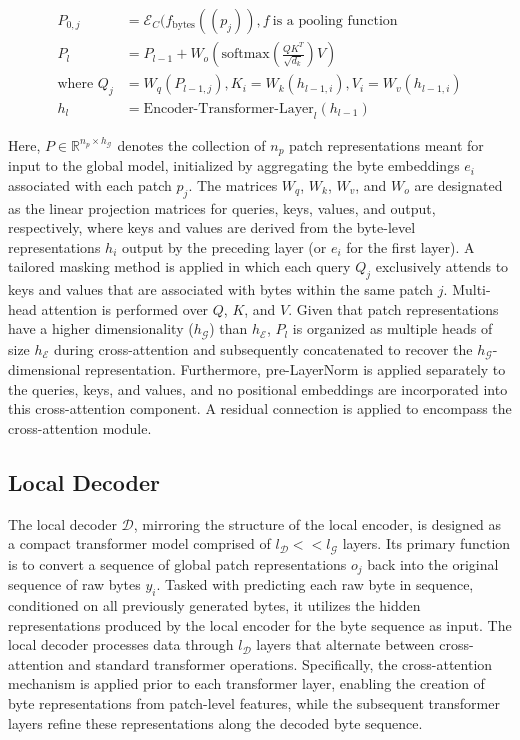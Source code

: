 \begin{align}
P_{0,j} &= \mathcal{E}_{C}(f_\text{bytes}((p_j)), f~ \text{is a pooling function} \\
P_l &= P_{l-1} + W_o\left(\text{softmax}\left(\frac{QK^T}{\sqrt{d_k}}\right)V\right) \\
\text{where } Q_j &= W_q(P_{l-1,j}), K_i = W_k(h_{l-1,i}), V_i = W_v(h_{l-1,i}) \\
h_l &= \text{Encoder-Transformer-Layer}_l(h_{l-1})
\end{align}

Here, $P \in \mathbb{R}^{n_p \times h_{\mathcal{G}}}$ denotes the collection of $n_p$ patch representations meant for input to the global model, initialized by aggregating the byte embeddings $e_i$ associated with each patch $p_j$. The matrices $W_q$, $W_k$, $W_v$, and $W_o$ are designated as the linear projection matrices for queries, keys, values, and output, respectively, where keys and values are derived from the byte-level representations $h_i$ output by the preceding layer (or $e_i$ for the first layer). A tailored masking method is applied in which each query $Q_j$ exclusively attends to keys and values that are associated with bytes within the same patch $j$. Multi-head attention is performed over $Q$, $K$, and $V$. Given that patch representations have a higher dimensionality ($h_{\mathcal{G}}$) than $h_{\mathcal{E}}$, $P_l$ is organized as multiple heads of size $h_{\mathcal{E}}$ during cross-attention and subsequently concatenated to recover the $h_{\mathcal{G}}$-dimensional representation. Furthermore, pre-LayerNorm is applied separately to the queries, keys, and values, and no positional embeddings are incorporated into this cross-attention component. A residual connection is applied to encompass the cross-attention module.

\subsection{Local Decoder} 

The local decoder $\mathcal{D}$, mirroring the structure of the local encoder, is designed as a compact transformer model comprised of $l_{\mathcal{D}} << l_{\mathcal{G}}$ layers. Its primary function is to convert a sequence of global patch representations $o_j$ back into the original sequence of raw bytes $y_i$. Tasked with predicting each raw byte in sequence, conditioned on all previously generated bytes, it utilizes the hidden representations produced by the local encoder for the byte sequence as input. The local decoder processes data through $l_{\mathcal{D}}$ layers that alternate between cross-attention and standard transformer operations. Specifically, the cross-attention mechanism is applied prior to each transformer layer, enabling the creation of byte representations from patch-level features, while the subsequent transformer layers refine these representations along the decoded byte sequence.


